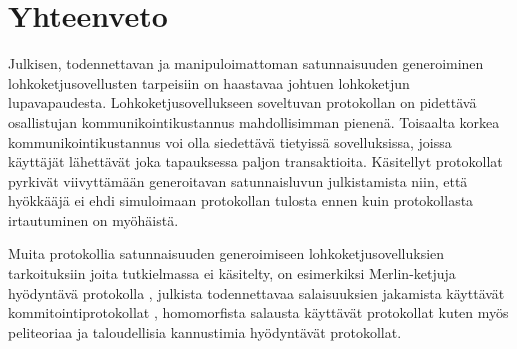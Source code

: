 \chapter{Yhteenveto\label{conclusions}}

Julkisen, todennettavan ja manipuloimattoman satunnaisuuden generoiminen lohkoketjusovellusten tarpeisiin on haastavaa johtuen lohkoketjun lupavapaudesta. Lohkoketjusovellukseen soveltuvan protokollan on pidettävä osallistujan kommunikointikustannus mahdollisimman pienenä. Toisaalta korkea kommunikointikustannus voi olla siedettävä tietyissä sovelluksissa, joissa käyttäjät lähettävät joka tapauksessa paljon transaktioita. Käsitellyt protokollat pyrkivät viivyttämään generoitavan satunnaisluvun julkistamista niin, että hyökkääjä ei ehdi simuloimaan protokollan tulosta ennen kuin protokollasta irtautuminen on myöhäistä.

Muita protokollia satunnaisuuden generoimiseen lohkoketjusovelluksien tarkoituksiin joita tutkielmassa ei käsitelty, on esimerkiksi Merlin-ketjuja hyödyntävä protokolla \cite{MerlinChains}, julkista todennettavaa salaisuuksien jakamista käyttävät kommitointiprotokollat \cite{syta_scalable_2017}, homomorfista salausta käyttävät protokollat \cite{nguyen-van_scalable_2019} kuten myös peliteoriaa ja taloudellisia kannustimia hyödyntävät protokollat.